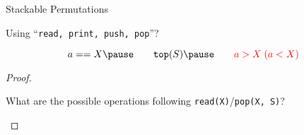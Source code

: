 \begin{frame}{}
  \begin{center}
    {\LARGE Stackable Permutations}
  \end{center}
\end{frame}


\begin{frame}{}
  \begin{definition}

  \end{definition}
\end{frame}

\begin{frame}{}
  \begin{definition}
  \end{definition}

  \vspace{0.20cm}
  \pause
  \begin{center}
     Using  ``\texttt{read, print, push, pop}''?
  \end{center}

  \pause
  \[
    a == X  \pause \qquad \texttt{top}(S) \pause \qquad \red{a > X \; (a < X)}
  \]
\end{frame}

\begin{frame}{}

  \begin{center}
  \end{center}

  \pause
  \begin{proof}
    \begin{center}
      What are the possible operations following \texttt{read(X)}/\texttt{pop(X, S)}? \\
    \end{center}
  \end{proof}
\end{frame}

